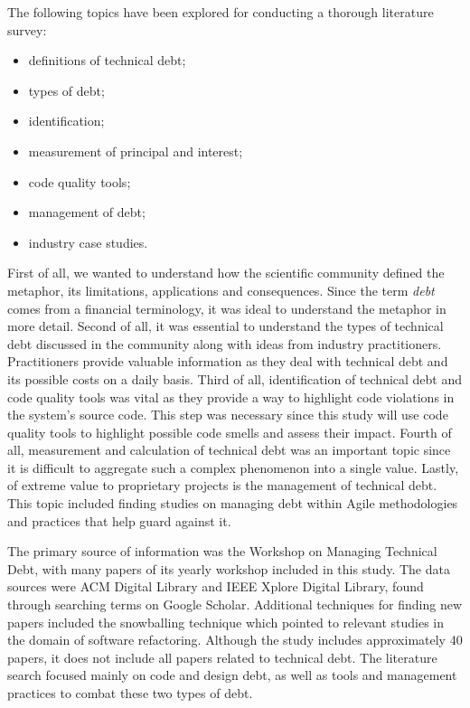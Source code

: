 \documentclass{mprop}
\begin{document}
The following topics have been explored for conducting a thorough literature
survey:
\begin{itemize}
	\item definitions of technical debt;
	\item types of debt;
	\item identification;
	\item measurement of principal and interest;
	\item code quality tools;
	\item management of debt;
	\item industry case studies.
\end{itemize}

First of all, we wanted to understand how the scientific community defined the
metaphor, its limitations, applications and consequences. Since the term
\emph{debt} comes from a financial terminology, it was ideal to understand the
metaphor in more detail. Second of all, it was essential to understand the types
of technical debt discussed in the community along with ideas from industry
practitioners. Practitioners provide valuable information as they deal with
technical debt and its possible costs on a daily basis. Third of all,
identification of technical debt and code quality tools was vital as they
provide a way to highlight code violations in the system's source code. This
step was necessary since this study will use code quality tools to highlight
possible code smells and assess their impact. Fourth of all, measurement and
calculation of technical debt was an important topic since it is difficult to
aggregate such a complex phenomenon into a single value. Lastly, of extreme
value to proprietary projects is the management of technical debt. This topic
included finding studies on managing debt within Agile methodologies and
practices that help guard against it.

The primary source of information was the Workshop on Managing Technical Debt,
with many papers of its yearly workshop included in this study. The data sources
were ACM Digital Library and IEEE Xplore Digital Library, found through
searching terms on Google Scholar. Additional techniques for finding new papers
included the snowballing technique which pointed to relevant studies in the
domain of software refactoring. Although the study includes approximately 40
papers, it does not include all papers related to technical debt. The literature
search focused mainly on code and design debt, as well as tools and management
practices to combat these two types of debt.
\end{document}
